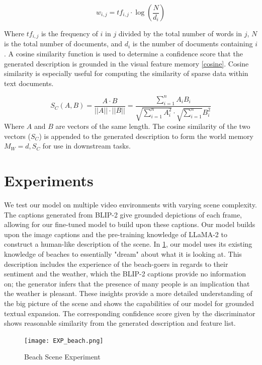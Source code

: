 \documentclass[conference]{IEEEtran}
\begin{document}
\begin{equation} \label{TF-IDF}
w_{i,j} = tf_{i,j} \cdot \log \left( \frac{N}{d_i} \right)
\end{equation}

Where $tf_{i,j}$ is the frequency of $i$ in $j$ divided by the total number of words in $j$, $N$ is the total number of documents, and $d_i$ is the number of documents containing $i$. A cosine similarity function is used to determine a confidence score that the generated description is grounded in the visual feature memory \ref{cosine}. Cosine similarity is especially useful for computing the similarity of sparse data within text documents.

\begin{equation} \label{cosine}
S_{C}(A,B)=\frac{A\cdot B}{||A||\cdot||B||}=\frac{\sum\limits_{i=1}^{n}A_{i}B_{i}}{\sqrt{\sum\limits_{i=1}^{n}A_{i}^{2}}\cdot\sqrt{\sum\limits_{i=1}^{n}}B_{i}^{2}}
\end{equation}
Where $A$ and $B$ are vectors of the same length. The cosine similarity of the two vectors ($S_C$) is appended to the generated description to form the world memory $M_W=d,S_C$ for use in downstream tasks.

\section{Experiments}

We test our model on multiple video environments with varying scene complexity. The captions generated from BLIP-2 give grounded depictions of each frame, allowing for our fine-tuned model to build upon these captions. Our model builds upon the image captions and the pre-training knowledge of LLaMA-2 to construct a human-like description of the scene. In \ref{fig:beach}, our model uses its existing knowledge of beaches to essentially "dream" about what it is looking at. This description includes the experience of the beach-goers in regards to their sentiment and the weather, which the BLIP-2 captions provide no information on; the generator infers that the presence of many people is an implication that the weather is pleasant. These insights provide a more detailed understanding of the big picture of the scene and shows the capabilities of our model for grounded textual expansion. The corresponding confidence score given by the discriminator shows reasonable similarity from the generated description and feature list. 

\begin{figure}[H] 
\centering
\texttt{[image: EXP\_beach.png]}
\caption{Beach Scene Experiment}
\label{fig:beach}
\end{figure}
\end{document}

